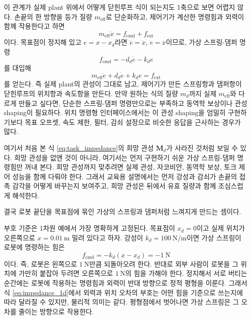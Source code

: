 이 관계가 실제 plant 위에서 어떻게 닫힌루프 식이 되는지도 1축으로 보면 어렵지 않다.
손끝의 한 방향을 등가 질량 $m_{\mathrm{eff}}$로 단순화하고, 제어기가 계산한 명령힘과 외력이 함께 작용한다고 하면
\begin{equation}
  m_{\mathrm{eff}}\ddot{x}=f_{\mathrm{cmd}}+f_{\mathrm{ext}}
\end{equation}
이다.
목표점이 정지해 있고 $e=x-x_d$라면 $\dot{e}=\dot{x}$, $\ddot{e}=\ddot{x}$이므로, 가상 스프링-댐퍼 명령
\begin{equation}
  f_{\mathrm{cmd}}=-d_d\dot{e}-k_de
\end{equation}
를 대입해
\begin{equation}
  m_{\mathrm{eff}}\ddot{e}+d_d\dot{e}+k_de=f_{\mathrm{ext}}
\end{equation}
를 얻는다.
즉 실제 plant의 관성이 그대로 남고, 제어기가 만든 스프링항과 댐퍼항이 닫힌루프의 위치항과 속도항을 만든다.
만약 원하는 식의 질량 $m_d$까지 실제 $m_{\mathrm{eff}}$와 다르게 만들고 싶다면, 단순한 스프링-댐퍼 명령만으로는 부족하고 동역학 보상이나 관성 shaping이 필요하다.
위치 명령형 인터페이스에서는 이 관성 shaping을 엄밀히 구현하기보다 목표 오프셋, 속도 제한, 필터, 감쇠 설정으로 비슷한 응답을 근사하는 경우가 많다.

여기서 처음 본 식 \eqref{eq:task_impedance}의 희망 관성 $\bm{M}_d$가 사라진 것처럼 보일 수 있다.
희망 관성을 없앤 것이 아니라, 여기서는 먼저 구현하기 쉬운 가상 스프링-댐퍼 명령힘만 꺼내 본다.
희망 관성까지 맞추려면 실제 관성, 자코비안, 동역학 보상, 토크 제어 성능을 함께 다뤄야 한다.
그래서 교육용 설명에서는 먼저 강성과 감쇠가 손끝의 접촉 감각을 어떻게 바꾸는지 보여주고, 희망 관성은 뒤에서 유효 질량과 함께 조심스럽게 해석한다.

결국 로봇 끝단을 목표점에 묶인 가상의 스프링과 댐퍼처럼 느껴지게 만드는 셈이다.

부호 기준은 1차원 예에서 가장 명확하게 고정된다.
목표점이 $x_d=0$이고 실제 위치가 오른쪽으로 $x=0.01~\mathrm{m}$ 밀려 있다고 하자.
강성이 $k_d=100~\mathrm{N/m}$이면 가상 스프링이 로봇에 명령하는 힘은
\begin{equation}
  f_{\mathrm{cmd}}=-k_d(x-x_d)=-1~\mathrm{N}
\end{equation}
이다.
즉, 로봇은 왼쪽으로 $1~\mathrm{N}$만큼 되돌아오려 한다.
반대로 외부 사람이 로봇을 그 위치에 가만히 붙잡아 두려면 오른쪽으로 $1~\mathrm{N}$의 힘을 가해야 한다.
정지해서 서로 버티는 순간에는 로봇에 작용하는 명령힘과 외력이 반대 방향으로 정적 평형을 이룬다.
그래서 식 \eqref{eq:impedance_1d}에서 외력과 위치 오차의 부호는 어떤 힘을 기준으로 쓰는지에 따라 달라질 수 있지만, 물리적 의미는 같다.
평형점에서 벗어나면 가상 스프링은 그 오차를 줄이는 방향으로 작용한다.

